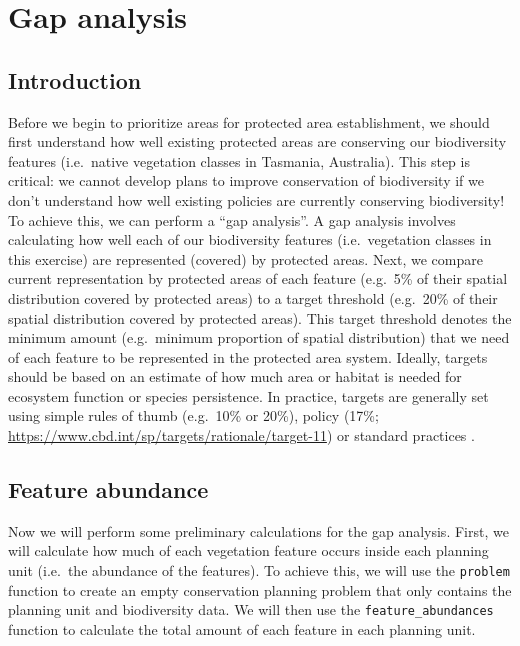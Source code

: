 \documentclass[12pt,]{book}
\begin{document}
\chapter{Gap analysis}\label{gap-analysis}

\section{Introduction}\label{introduction-1}

Before we begin to prioritize areas for protected area establishment, we
should first understand how well existing protected areas are conserving
our biodiversity features (i.e.~native vegetation classes in Tasmania,
Australia). This step is critical: we cannot develop plans to improve
conservation of biodiversity if we don't understand how well existing
policies are currently conserving biodiversity! To achieve this, we can
perform a ``gap analysis''. A gap analysis involves calculating how well
each of our biodiversity features (i.e.~vegetation classes in this
exercise) are represented (covered) by protected areas. Next, we compare
current representation by protected areas of each feature (e.g.~5\% of
their spatial distribution covered by protected areas) to a target
threshold (e.g.~20\% of their spatial distribution covered by protected
areas). This target threshold denotes the minimum amount (e.g.~minimum
proportion of spatial distribution) that we need of each feature to be
represented in the protected area system. Ideally, targets should be
based on an estimate of how much area or habitat is needed for ecosystem
function or species persistence. In practice, targets are generally set
using simple rules of thumb (e.g.~10\% or 20\%), policy (17\%;
\url{https://www.cbd.int/sp/targets/rationale/target-11}) or standard
practices \citep[e.g.~setting targets for species based on
range-size;][]{r1, r2}.

\section{Feature abundance}\label{feature-abundance}

Now we will perform some preliminary calculations for the gap analysis.
First, we will calculate how much of each vegetation feature occurs
inside each planning unit (i.e.~the abundance of the features). To
achieve this, we will use the \texttt{problem} function to create an
empty conservation planning problem that only contains the planning unit
and biodiversity data. We will then use the \texttt{feature\_abundances}
function to calculate the total amount of each feature in each planning
unit.
\end{document}
